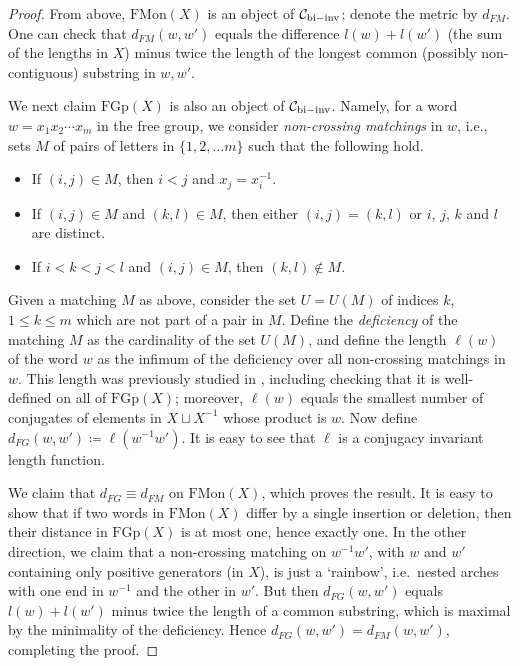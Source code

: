 \documentclass[11pt,a4paper,reqno]{amsart}
\numberwithin{equation}{section}
\theoremstyle{plain}
\theoremstyle{definition}
\newcommand\normsymb{\ell}  %
\newcommand\norm[1]{\ell({#1})}   %
\begin{document}
\begin{proof}
From above, $\mathrm{FMon}(X)$ is an object of
$\mathcal{C}_{\rm{bi-inv}}$; denote the metric by $d_{FM}$. One can check
that $d_{FM}(w,w')$ equals the difference $l(w) + l(w')$ (the sum of the
lengths in $X$) minus twice the length of the longest common (possibly
non-contiguous) substring in $w,w'$.

We next claim $\mathrm{FGp}(X)$ is also an object of
$\mathcal{C}_{\rm{bi-inv}}$. Namely, for a word $w=x_1x_2\cdots x_m$ in
the free group, we consider \emph{non-crossing matchings} in $w$, i.e.,
sets $M$ of pairs of letters in $\{1,2,\dots m\}$ such that the following
hold.
\begin{itemize}
\item If $(i, j)\in M$, then $i< j$ and  $x_j=x_i^{-1}$.
\item If $(i, j)\in M$ and $(k, l)\in M$, then either $(i, j) = (k, l)$
or $i$, $j$, $k$ and $l$ are distinct.
\item If $i<k<j<l$ and $(i, j)\in M$, then $(k, l)\notin M$.
\end{itemize}

Given a matching $M$ as above, consider the set $U=U(M)$ of indices $k$,
$1\leq k\leq m$ which are not part of a pair in $M$. Define the
\emph{deficiency} of the matching $M$ as the cardinality of the set
$U(M)$, and define the length $\norm{w}$ of the word $w$ as the infimum
of the deficiency over all non-crossing matchings in $w$.
This length was previously studied in \cite{gadgil}, including checking
that it is well-defined on all of $\mathrm{FGp}(X)$; moreover, $\norm{w}$
equals the smallest number of conjugates of elements in $X \sqcup X^{-1}$
whose product is $w$. Now define $d_{FG}(w,w') \coloneqq \norm{w^{-1}
w'}$. It is easy to see that $\normsymb$ is a conjugacy invariant length
function.

We claim that $d_{FG} \equiv d_{FM}$ on $\mathrm{FMon}(X)$, which proves
the result. It is easy to show that if two words in $\mathrm{FMon}(X)$
differ by a single insertion or deletion, then their distance in
$\mathrm{FGp}(X)$ is at most one, hence exactly one. In the other
direction, we claim that a non-crossing matching on $w^{-1}w'$, with $w$
and $w'$ containing only positive generators (in $X$), is just a
`rainbow', i.e.~nested arches with one end in $w^{-1}$ and the other in
$w'$. But then $d_{FG}(w,w')$ equals $l(w) + l(w')$ minus twice the
length of a common substring, which is maximal by the minimality of the
deficiency. Hence $d_{FG}(w,w') = d_{FM}(w,w')$, completing the proof.
\end{proof}
\end{document}
